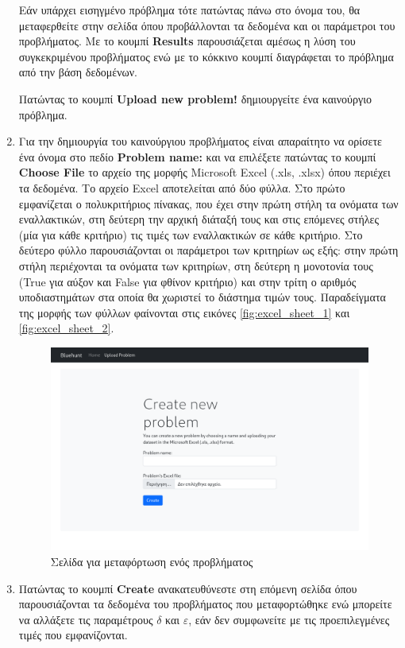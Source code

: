 \documentclass[11pt,a4paper,titlepage]{article}
\numberwithin{equation}{section}
\begin{document}
\begin{enumerate}
	Εάν υπάρχει εισηγμένο πρόβλημα τότε πατώντας πάνω στο όνομα του, θα μεταφερθείτε στην σελίδα όπου προβάλλονται τα δεδομένα και οι παράμετροι του προβλήματος. Με το κουμπί \textbf{Results} παρουσιάζεται αμέσως η λύση του συγκεκριμένου προβλήματος ενώ με το κόκκινο κουμπί διαγράφεται το πρόβλημα από την βάση δεδομένων.
	
	Πατώντας το κουμπί \textbf{Upload new problem!} δημιουργείτε ένα καινούργιο πρόβλημα.
	
	\item Για την δημιουργία του καινούργιου προβλήματος είναι απαραίτητο να ορίσετε ένα όνομα στο πεδίο \textbf{Problem name:} και να επιλέξετε πατώντας το κουμπί \textbf{Choose File} το αρχείο της μορφής Microsoft Excel (.xls, .xlsx) όπου περιέχει τα δεδομένα. Το αρχείο Excel αποτελείται από δύο φύλλα. Στο πρώτο εμφανίζεται ο πολυκριτήριος πίνακας, που έχει στην πρώτη στήλη τα ονόματα των εναλλακτικών, στη δεύτερη 
    την αρχική διάταξή τους και στις επόμενες στήλες (μία για κάθε κριτήριο) τις τιμές των εναλλακτικών σε κάθε κριτήριο. Στο δεύτερο φύλλο παρουσιάζονται οι παράμετροι των κριτηρίων ως εξής: στην πρώτη στήλη περιέχονται τα ονόματα των κριτηρίων, στη δεύτερη η μονοτονία τους (True για αύξον και False για φθίνον κριτήριο) και στην τρίτη ο αριθμός υποδιαστημάτων στα οποία θα χωριστεί το διάστημα τιμών τους. Παραδείγματα της μορφής των φύλλων φαίνονται στις εικόνες \ref{fig:excel_sheet_1} και \ref{fig:excel_sheet_2}.
	
	\begin{figure}[H]
		\centering
		\includegraphics[width=0.8\linewidth]{media/upload.png}
		\caption{Σελίδα για μεταφόρτωση ενός προβλήματος}
		\label{fig:uplaod}
	\end{figure}
	
	\item Πατώντας το κουμπί \textbf{Create} ανακατευθύνεστε στη επόμενη σελίδα όπου παρουσιάζονται τα δεδομένα του προβλήματος που μεταφορτώθηκε ενώ μπορείτε να αλλάξετε τις παραμέτρους $δ$ και $ε$, εάν δεν συμφωνείτε με τις προεπιλεγμένες τιμές που εμφανίζονται.
	

\end{enumerate}
\end{document}
